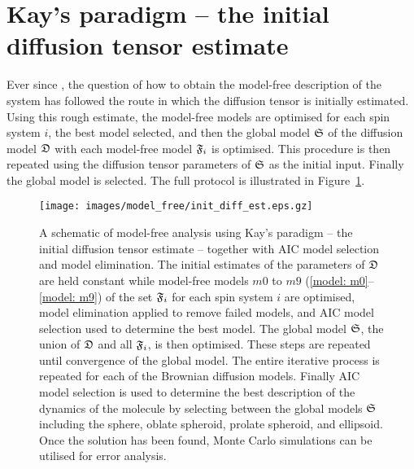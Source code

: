 
\section{Kay's paradigm -- the initial diffusion tensor estimate}

Ever since \citet{Kay89}, the question of how to obtain the model-free description of the system has followed the route in which the diffusion tensor is initially estimated.  Using this rough estimate, the model-free models are optimised for each spin system $i$, the best model selected, and then the global model $\mathfrak{S}$ of the diffusion model $\mathfrak{D}$ with each model-free model $\mathfrak{F}_i$ is optimised.  This procedure is then repeated using the diffusion tensor parameters of $\mathfrak{S}$ as the initial input.  Finally the global model is selected.  The full protocol is illustrated in Figure~\ref{fig: init diff estimate}.


\begin{figure}
\centerline{\texttt{[image: images/model\_free/init\_diff\_est.eps.gz]}}
\caption[Model-free analysis using Kay's paradigm -- the initial diffusion tensor estimate]{A schematic of model-free analysis using Kay's paradigm -- the initial diffusion tensor estimate -- together with AIC model selection and model elimination.  The initial estimates of the parameters of $\mathfrak{D}$ are held constant while model-free models $m0$ to $m9$ (\ref{model: m0}--\ref{model: m9}) of the set $\mathfrak{F}_i$ for each spin system $i$ are optimised, model elimination applied to remove failed models, and AIC model selection used to determine the best model.  The global model $\mathfrak{S}$, the union of $\mathfrak{D}$ and all $\mathfrak{F}_i$, is then optimised.  These steps are repeated until convergence of the global model.  The entire iterative process is repeated for each of the Brownian diffusion models.  Finally AIC model selection is used to determine the best description of the dynamics of the molecule by selecting between the global models $\mathfrak{S}$ including the sphere, oblate spheroid, prolate spheroid, and ellipsoid.  Once the solution has been found, Monte Carlo simulations can be utilised for error analysis.} \label{fig: init diff estimate}
\end{figure}




